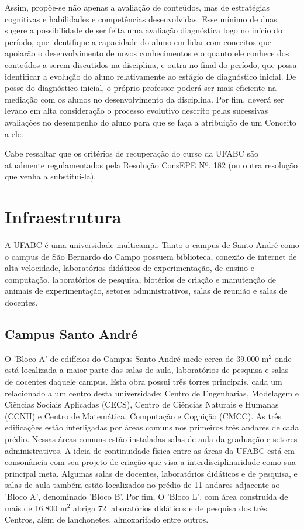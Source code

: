 \documentclass{article}
\begin{document}
Assim, propõe-se não apenas a avaliação de conteúdos, mas de estratégias cognitivas e
habilidades e competências desenvolvidas. Esse mínimo de duas sugere a possibilidade de ser feita uma avaliação diagnóstica logo no início do período, que identifique a capacidade do aluno em lidar com conceitos que apoiarão o desenvolvimento de novos conhecimentos e o quanto ele conhece dos conteúdos a serem discutidos na disciplina, e outra no final do período, que possa identificar a evolução do aluno relativamente ao estágio de diagnóstico inicial. De posse do diagnóstico inicial, o próprio professor poderá ser mais eficiente na mediação com os alunos no desenvolvimento da disciplina. Por fim, deverá ser levado em alta consideração o processo evolutivo descrito pelas sucessivas avaliações no desempenho do aluno para que se faça a atribuição de um Conceito a ele.

Cabe ressaltar que os critérios de recuperação do curso da UFABC são atualmente regulamentados pela Resolução ConsEPE Nº. 182 (ou outra resolução que venha a substituí-la).





\newpage
\section {Infraestrutura}

A UFABC é uma universidade multicampi. Tanto o campus de Santo André como o campus de São Bernardo do Campo possuem biblioteca, conexão de internet de alta velocidade, laboratórios didáticos de experimentação, de ensino e computação, laboratórios de pesquisa, biotérios de criação e manutenção de animais de experimentação, setores administrativos, salas de reunião e salas de docentes.

\subsection{Campus Santo André}
  
O 'Bloco A' de edifícios do Campus Santo André mede cerca de 39.000 m$^2$ onde está localizada a maior parte das salas de aula, laboratórios de pesquisa e salas de docentes daquele campus. Esta obra possui três torres principais, cada um relacionado a um centro desta universidade: Centro de Engenharias, Modelagem e Ciências Sociais Aplicadas (CECS), Centro de Ciências Naturais e Humanas (CCNH) e Centro de Matemática, Computação e Cognição (CMCC). As três edificações estão interligadas por áreas comuns nos primeiros três andares de cada prédio. Nessas áreas comuns estão instaladas salas de aula da graduação e setores administrativos. A ideia de continuidade física entre as áreas da UFABC está em consonância com seu projeto de criação que visa a interdisciplinaridade como sua principal meta. Algumas salas de docentes, laboratórios didáticos e de pesquisa, e salas de aula também estão localizados no prédio de 11 andares adjacente ao 'Bloco A', denominado 'Bloco B'. Por fim, O 'Bloco L', com área construída de mais de 16.800 m$^2$ abriga 72 laboratórios didáticos e de pesquisa dos três Centros, além de lanchonetes, almoxarifado entre outros.
\end{document}
